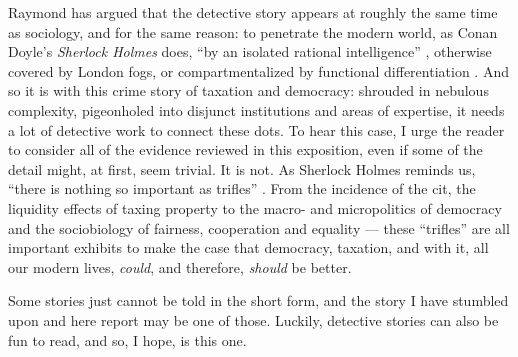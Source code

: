 Raymond \citeauthor{Williams1992} has argued that the detective story appears at roughly the same time as sociology, and for the same reason:
to penetrate the modern world, as Conan Doyle's \emph{Sherlock Holmes} does, ``by an isolated rational intelligence'' \citep[88]{Williams1992}, otherwise covered by London fogs, or compartmentalized by functional differentiation \citep{Durkheim-1893-aa}.
And so it is with this crime story of taxation and democracy:
shrouded in nebulous complexity, pigeonholed into disjunct institutions and areas of expertise, it needs a lot of detective work to connect these dots.
To hear this case, I urge the reader to consider all of the evidence reviewed in this exposition, even if some of the detail might, at first, seem trivial.
It is not.
As Sherlock Holmes reminds us, ``there is nothing so important as trifles'' \citep[238]{Doyle1891}.
From the incidence of the \gls{cit}, the liquidity effects of taxing property to the macro- and micropolitics of democracy and the sociobiology of fairness, cooperation and equality
--- these ``trifles'' are all important exhibits to make the case that democracy, taxation, and with it, all our modern lives, \emph{could}, and therefore, \emph{should} be better.

Some stories just cannot be told in the short form, and the story I have stumbled upon and here report may be one of those.
Luckily, detective stories can also be fun to read, and so, I hope, is this one.
